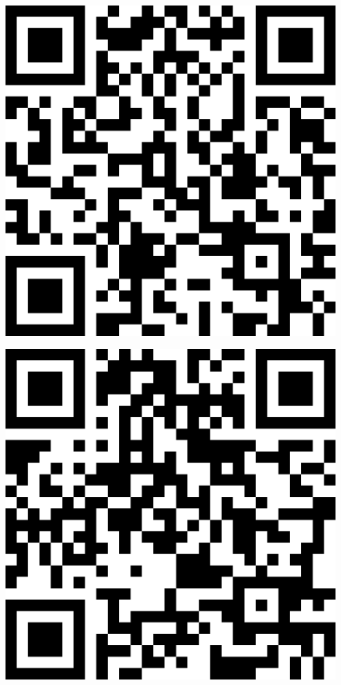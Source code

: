 \documentclass[letterpaper]{article}
\begin{document}
 \endgroup 
 \vspace*{\fill} 
 \pagebreak 
{} 
 \vspace*{\fill} 
 \begingroup 
 \centerline{\includegraphics[scale=1,width=5in,height=5in]{Office3509.png}} 
 \endgroup 
 \vspace*{\fill} 
 \pagebreak 
{} 
 \vspace*{\fill} 
 \begingroup 
 \centerline{\includegraphics[scale=1,width=5in,height=5in]{Office3511.png}} 
\end{document}
